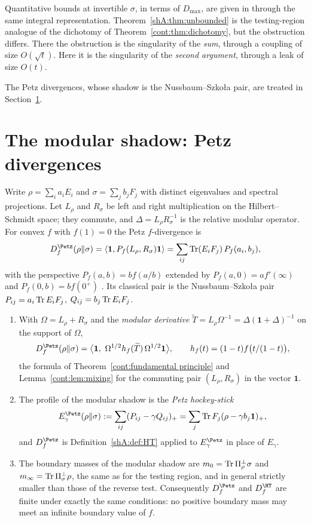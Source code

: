 Quantitative bounds at invertible $\sigma$, in terms of $D_{\max}$, are given in \cite{BLT2024} through the same integral representation. Theorem~\ref{shA:thm:unbounded} is the testing-region analogue of the dichotomy of Theorem~\ref{cont:thm:dichotomy}, but the obstruction differs. There the obstruction is the singularity of the \emph{sum}, through a coupling of size $O(\sqrt t)$. Here it is the singularity of the \emph{second argument}, through a leak of size $O(t)$.

The Petz divergences, whose shadow is the Nussbaum--Szko{\l}a pair, are treated in Section~\ref{shA:sec:petz}.

\section{The modular shadow: Petz divergences}\label{shA:sec:petz}

Write $\rho=\sum_ia_iE_i$ and $\sigma=\sum_jb_jF_j$ with distinct eigenvalues and spectral projections. Let $L_\rho$ and $R_\sigma$ be left and right multiplication on the Hilbert--Schmidt space; they commute, and $\Delta=L_\rho R_\sigma^{-1}$ is the relative modular operator. For convex $f$ with $f(1)=0$ the Petz $f$-divergence is
\[
D^\Petz_f(\rho\|\sigma)=\langle\mathbf 1,P_f(L_\rho,R_\sigma)\mathbf 1\rangle=\sum_{ij}\Tr(E_iF_j)\,P_f(a_i,b_j),
\]
with the perspective $P_f(a,b)=bf(a/b)$ extended by $P_f(a,0)=af'(\infty)$ and $P_f(0,b)=bf(0^+)$ \cite{HiaiMosonyi2017}. Its classical pair is the Nussbaum--Szko{\l}a pair $P_{ij}=a_i\operatorname{Tr} E_iF_j$, $Q_{ij}=b_j\operatorname{Tr} E_iF_j$.

\begin{theorem}\label{shA:thm:modular}
\begin{enumerate}[label=(\alph*)]
\item With $\Omega=L_\rho+R_\sigma$ and the \emph{modular derivative} $\widetilde T=L_\rho\Omega^{-1}=\Delta(\mathbf 1+\Delta)^{-1}$ on the support of $\Omega$,
\[
D^\Petz_f(\rho\|\sigma)=\big\langle\mathbf 1,\ \Omega^{1/2}h_f(\widetilde T)\,\Omega^{1/2}\mathbf 1\big\rangle,\qquad h_f(t)=(1-t)f\big(t/(1-t)\big),
\]
the formula of Theorem~\ref{cont:fundamental principle} and Lemma~\ref{cont:lem:mixing} for the commuting pair $(L_\rho,R_\sigma)$ in the vector $\mathbf 1$.
\item The profile of the modular shadow is the \emph{Petz hockey-stick}
\[
E^\Petz_\gamma(\rho\|\sigma):=\sum_{ij}(P_{ij}-\gamma Q_{ij})_+=\sum_j\Tr F_j(\rho-\gamma b_j\mathbf 1)_+ ,
\]
and $D^\Petz_f$ is Definition~\ref{shA:def:HT} applied to $E^\Petz_\gamma$ in place of $E_\gamma$.
\item The boundary masses of the modular shadow are $m_0=\operatorname{Tr}\Pi_\rho^\perp\sigma$ and $m_\infty=\operatorname{Tr}\Pi_\sigma^\perp\rho$, the same as for the testing region, and in general strictly smaller than those of the reverse test. Consequently $D^\Petz_f$ and $D^\HT_f$ are finite under exactly the same conditions: no positive boundary mass may meet an infinite boundary value of $f$.
\end{enumerate}
\end{theorem}

